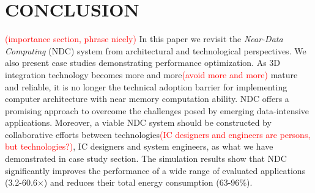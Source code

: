\documentclass[letterpaper, 11pt, conference, margin=1in]{ieeeconf}   %
\newcommand\myworries[1]{\textcolor{red}{(#1)}}
\begin{document}
\section{CONCLUSION}
\myworries{importance section, phrase nicely}
In this paper we revisit the \textit{Near-Data Computing} (NDC) system from architectural and technological perspectives. We also present case studies demonstrating performance optimization. As 3D integration technology becomes more and more\myworries{avoid more and more} mature and reliable, it is no longer the technical adoption barrier for implementing computer architecture with near memory computation ability. NDC offers a promising approach to overcome the challenges posed by emerging data-intensive applications. Moreover, a viable NDC system should be constructed by collaborative efforts between technologies\myworries{IC designers and engineers are persons, but technologies?}, IC designers and system engineers, as what we have demonstrated in case study section. The simulation results show that NDC significantly improves the performance of a wide range of evaluated applications (3.2-60.6$\times$) and reduces their total energy consumption (63-96$\%$).


















\end{document}
